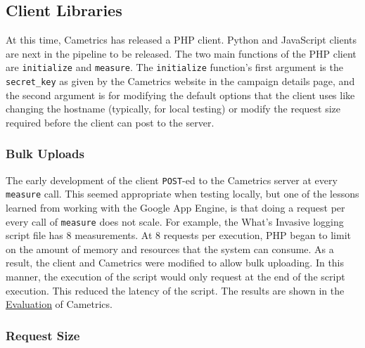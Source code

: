 \documentclass[10pt,a4paper,english]{article}
\begin{document}

\hypertarget{client-libraries}{}
\subsection*{Client Libraries}
\label{client-libraries}

At this time, Cametrics has released a PHP client. Python and JavaScript clients are next in the pipeline to be released. The two main functions of the PHP client are \texttt{initialize} and \texttt{measure}. The \texttt{initialize} function's first argument is the \texttt{secret{\_}key} as given by the Cametrics website in the campaign details page, and the second argument is for modifying the default options that the client uses like changing the hostname (typically, for local testing) or modify the request size required before the client can post to the server.



\hypertarget{bulk-uploads}{}
\subsubsection*{Bulk Uploads}
\label{bulk-uploads}

The early development of the client \texttt{POST}-ed to the Cametrics server at every \texttt{measure} call. This seemed appropriate when testing locally, but one of the lessons learned from working with the Google App Engine, is that doing a request per every call of \texttt{measure} does not scale. For example, the What's Invasive logging script file has 8 measurements. At 8 requests per execution, PHP began to limit on the amount of memory and resources that the system can consume. As a result, the client and Cametrics were modified to allow bulk uploading. In this manner, the execution of the script would only request at the end of the script execution. This reduced the latency of the script. The results are shown in the \href{\#evaluation}{Evaluation} of Cametrics.



\hypertarget{request-size}{}
\subsubsection*{Request Size}
\label{request-size}
\end{document}
